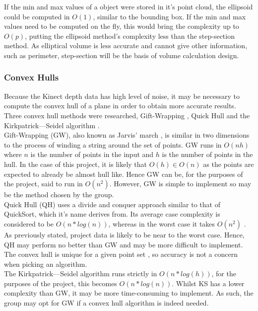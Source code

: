 If the min and max values of a object were stored in it's point cloud, the ellipsoid could be computed in $O(1)$, similar to the bounding box. 
If the min and max values need to be computed on the fly, this would bring the complexity up to $O(p)$, putting the ellipsoid method's complexity less than the step-section method. As elliptical volume is less accurate and cannot give other information, such as perimeter, step-section will be the basis of volume calculation design.\\

\subsubsection{Convex Hulls}
Because the Kinect depth data has high level of noise, it may be necessary to compute the convex hull of a plane in order to obtain more accurate results. Three convex hull methods were researched, Gift-Wrapping \cite{Cormen2001}, Quick Hull \cite{Barber1996} and the Kirkpatrick--–Seidel algorithm \cite{kirkpatrick1986}.\\

Gift-Wrapping (GW), also known as Jarvis' march \cite{Jarvis1973}, is similar in two dimensions to the process of winding a string around the set of points. 
GW runs in $O(nh)$ \cite{Cormen2001} where $n$ is the number of points in the input and $h$ is the number of points in the hull. In the case of this project, it is likely that $O(h) \in O(n)$ as the points are expected to already be almost hull like. 
Hence GW can be, for the purposes of the project, said to run in $O(n^2)$. However, GW is simple to implement so may be the method chosen by the group.\\

Quick Hull (QH) uses a divide and conquer approach similar to that of QuickSort, which it's name derives from. Its average case complexity is considered to be $O(n * log(n))$, whereas in the worst case it takes $O(n^2)$ \cite{Barber1996}. As previously stated, project data is likely to be near to the worst case. Hence, QH may perform no better than GW and may be more difficult to implement. The convex hull is unique for a given point set \cite{Sedgewick2012}, so accuracy is not a concern when picking an algorithm.\\

The Kirkpatrick--–Seidel algorithm runs strictly in $O(n*log(h))$, for the purposes of the project, this becomes $O(n*log(n))$. Whilst KS has a lower complexity than GW, it may be more time-consuming to implement. As such, the group may opt for GW if a convex hull algorithm is indeed needed.\\